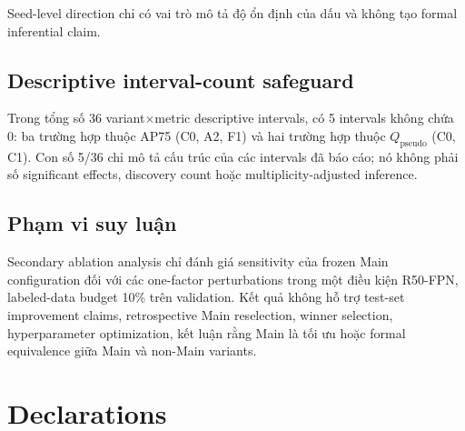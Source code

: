 \documentclass[pdflatex,sn-mathphys-num]{sn-jnl}%
\theoremstyle{thmstyleone}%
\theoremstyle{thmstyletwo}%
\theoremstyle{thmstylethree}%
\begin{document}
Seed-level direction chỉ có vai trò mô tả độ ổn định của dấu và không tạo formal inferential claim.

\subsection{Descriptive interval-count safeguard}

Trong tổng số 36 variant$\times$metric descriptive intervals, có 5 intervals không chứa 0: ba trường hợp thuộc AP75 (C0, A2, F1) và hai trường hợp thuộc $Q_{\mathrm{pseudo}}$ (C0, C1). Con số 5/36 chỉ mô tả cấu trúc của các intervals đã báo cáo; nó không phải số significant effects, discovery count hoặc multiplicity-adjusted inference.

\subsection{Phạm vi suy luận}

Secondary ablation analysis chỉ đánh giá sensitivity của frozen Main configuration đối với các one-factor perturbations trong một điều kiện R50-FPN, labeled-data budget 10\% trên validation. Kết quả không hỗ trợ test-set improvement claims, retrospective Main reselection, winner selection, hyperparameter optimization, kết luận rằng Main là tối ưu hoặc formal equivalence giữa Main và non-Main variants.


\section*{Declarations}
\end{document}
